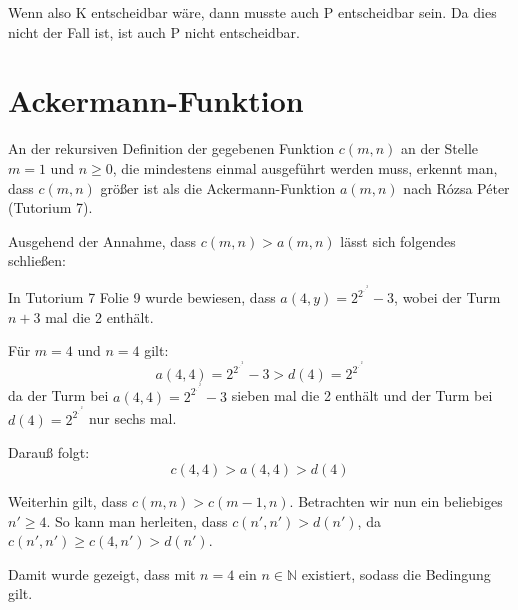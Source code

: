 \documentclass[10pt,leqno ]{article}
\begin{document}
\begin{flushleft}
    Wenn also K entscheidbar wäre, dann musste auch P entscheidbar sein. Da dies nicht der Fall ist, ist auch P nicht entscheidbar. 
\end{flushleft}

\pagebreak

\section{Ackermann-Funktion}

An der rekursiven Definition der gegebenen Funktion $c(m,n)$ an der Stelle $m=1$ und  $n \geq 0$, die mindestens einmal ausgeführt werden muss, erkennt man, dass  $c(m,n)$ größer ist als die Ackermann-Funktion $a(m,n)$ nach Rózsa Péter (Tutorium 7). 
\begin{flushleft}
Ausgehend der Annahme, dass $c(m,n) > a(m,n)$ lässt sich folgendes schließen: 
\end{flushleft}

\begin{flushleft}
In Tutorium 7 Folie 9 wurde bewiesen, dass $a(4,y)=2^{2^{.^{.^{2}}}}-3$, wobei der Turm $n+3$ mal die 2 enthält.
\end{flushleft}

\begin{flushleft}
    Für $m=4$ und $n=4$ gilt: \[ a(4,4)= 2^{2^{.^{.^{2}}}} - 3 > d(4) =  2^{2^{.^{.^{2}}}} \] da der Turm bei $a(4,4)= 2^{2^{.^{.^{2}}}} - 3$ sieben mal die 2 enthält und der Turm bei $d(4) =  2^{2^{.^{.^{2}}}}$ nur sechs mal. 
    
    Darauß folgt: \[ c(4,4) > a(4,4) > d(4)  \]
\end{flushleft}

\begin{flushleft}
    Weiterhin gilt, dass $c(m,n) > c(m-1,n)$. Betrachten wir nun ein beliebiges $n' \ge 4$. So kann man herleiten, dass $c(n',n') > d(n')$, da $c(n',n') \ge c(4,n') > d(n')$.
\end{flushleft}

Damit wurde gezeigt, dass mit $n = 4 $ ein $n \in \mathbb{N}$ existiert, sodass  die Bedingung gilt.
\end{document}
